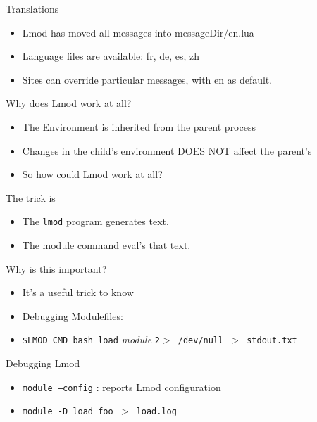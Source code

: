 \documentclass{beamer}
\begin{document}
\begin{frame}{Translations}
  \begin{itemize}
    \item Lmod has moved all messages into messageDir/en.lua
    \item Language files are available: fr, de, es, zh
    \item Sites can override particular messages, with en as default.
  \end{itemize}
\end{frame}


\begin{frame}{Why does Lmod work at all?}
  \begin{itemize}
    \item The Environment is inherited from the parent process
    \item Changes in the child's environment DOES NOT affect the
      parent's
    \item So how could Lmod work at all? 
  \end{itemize}
\end{frame}

\begin{frame}{The trick is}
  \begin{itemize}
    \item The \texttt{lmod} program generates text.
    \item The module command eval's that text.
  \end{itemize}
\end{frame}

\begin{frame}{Why is this important?}
  \begin{itemize}
    \item It's a useful trick to know
    \item Debugging Modulefiles:
    \item \texttt{\$LMOD\_CMD bash load} \emph{module} \texttt{2$>$
        /dev/null $>$ stdout.txt}
  \end{itemize}
\end{frame}

\begin{frame}{Debugging Lmod}
  \begin{itemize}
    \item \texttt{module --config} : reports Lmod configuration
    \item \texttt{module -D load foo $>$ load.log}
  \end{itemize}
\end{frame}
\end{document}
